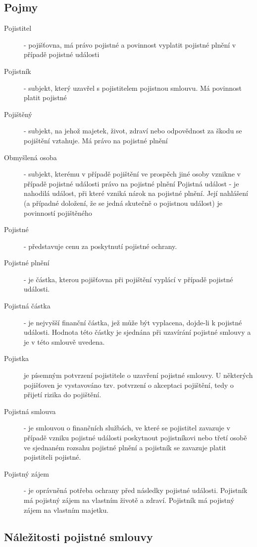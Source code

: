 \subsection*{Pojmy}
\begin{description}
    \item[Pojistitel] - pojišťovna, má právo pojistné a povinnost vyplatit pojistné plnění v případě pojistné události
    \item[Pojistník] - subjekt, který uzavřel s pojistitelem pojistnou smlouvu. Má povinnost platit pojistné
    \item[Pojištěný] - subjekt, na jehož majetek, život, zdraví nebo odpovědnost za škodu se pojištění vztahuje. Má právo na pojistné plnění
    \item[Obmyšlená osoba] - subjekt, kterému v případě pojištění ve prospěch jiné osoby vznikne v případě pojistné události právo na pojistné plnění Pojistná událost - je nahodilá událost, při které vzniká nárok na pojistné plnění. Její nahlášení (a případné doložení, že se jedná skutečně o pojistnou událost) je povinností pojištěného
    \item[Pojistné] - představuje cenu za poskytnutí pojistné ochrany.
    \item[Pojistné plnění] - je částka, kterou pojišťovna při pojištění vyplácí v případě pojistné události.
    \item[Pojistná částka] - je nejvyšší finanční částka, jež může být vyplacena, dojde-li k pojistné události. Hodnota této částky je sjednána při uzavírání pojistné smlouvy a je v této smlouvě uvedena.
    \item[Pojistka] je písemným potvrzení pojistitele o uzavření pojistné smlouvy. U některých pojišťoven je vystavováno tzv. potvrzení o akceptaci pojištění, tedy o přijetí rizika do pojištění.
    \item[Pojistná smlouva] - je smlouvou o finančních službách, ve které se pojistitel zavazuje v případě vzniku pojistné události poskytnout pojistníkovi nebo třetí osobě ve sjednaném rozsahu pojistné plnění a pojistník se zavazuje platit pojistiteli pojistné.
    \item[Pojistný zájem] - je oprávněná potřeba ochrany před následky pojistné události. Pojistník má pojistný zájem na vlastním životě a zdraví. Pojistník má pojistný zájem na vlastním majetku.
\end{description}

\subsection*{Náležitosti pojistné smlouvy}


